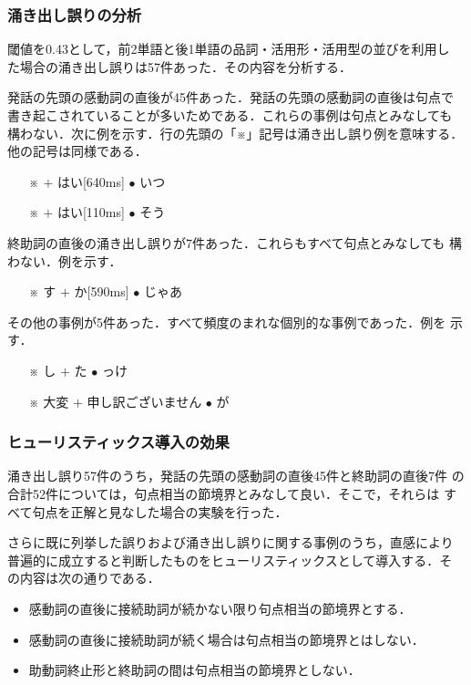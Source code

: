 \subsubsection{涌き出し誤りの分析}

閾値を0.43として，前2単語と後1単語の品詞・活用形・活用型の並びを利用し
た場合の涌き出し誤りは57件あった．その内容を分析する．

発話の先頭の感動詞の直後が45件あった．発話の先頭の感動詞の直後は句点で
書き起こされていることが多いためである．これらの事例は句点とみなしても
構わない．次に例を示す．行の先頭の「※」記号は涌き出し誤り例を意味する．
他の記号は同様である．

\begin{itemize}
\item[※]  $+$ はい[640ms] $\bullet$ いつ
\item[※]  $+$ はい[110ms] $\bullet$ そう
\end{itemize}

終助詞の直後の涌き出し誤りが7件あった．これらもすべて句点とみなしても
構わない．例を示す．

\begin{itemize}
\item[※] す $+$ か[590ms] $\bullet$ じゃあ
\end{itemize}

その他の事例が5件あった．すべて頻度のまれな個別的な事例であった．例を
示す．

\begin{itemize}
\item[※] し $+$ た $\bullet$ っけ
\item[※] 大変 $+$ 申し訳ございません $\bullet$ が
\end{itemize}

\subsubsection{ヒューリスティックス導入の効果}

涌き出し誤り57件のうち，発話の先頭の感動詞の直後45件と終助詞の直後7件
の合計52件については，句点相当の節境界とみなして良い．そこで，それらは
すべて句点を正解と見なした場合の実験を行った．

さらに既に列挙した誤りおよび涌き出し誤りに関する事例のうち，直感により
普遍的に成立すると判断したものをヒューリスティックスとして導入する．そ
の内容は次の通りである．

\begin{itemize}
\item 感動詞の直後に接続助詞が続かない限り句点相当の節境界とする．
\item 感動詞の直後に接続助詞が続く場合は句点相当の節境界とはしない．
\item 助動詞終止形と終助詞の間は句点相当の節境界としない．
\end{itemize}

